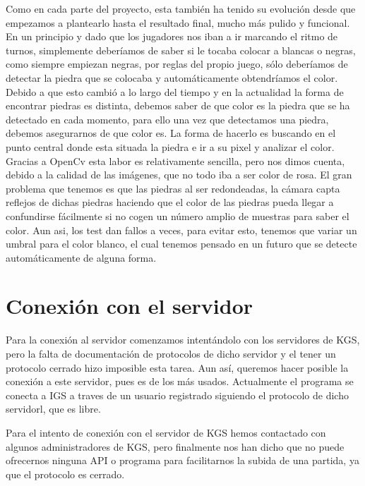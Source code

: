 \documentclass[12pt,a4papert,woside,openright,titlepage,final]{book}
\begin{document}
Como en cada parte del proyecto, esta también ha tenido su evolución desde que
empezamos a plantearlo hasta el resultado final, mucho más pulido y funcional.
En un principio y dado que los jugadores nos iban a ir marcando el ritmo de
turnos, simplemente deberíamos de saber si le tocaba colocar a blancas o negras, como
siempre empiezan negras, por reglas del propio juego, sólo deberíamos de detectar la
piedra que se colocaba y automáticamente obtendríamos el color. 
Debido a que esto cambió a lo largo del tiempo y en la actualidad la forma de
encontrar piedras es distinta, debemos saber de que color es la piedra que se ha
detectado en cada momento, para ello una vez que detectamos una piedra, debemos
asegurarnos de que color es. La forma de hacerlo es buscando en el punto central
donde esta situada la piedra e ir a su pixel y analizar el color. Gracias a
OpenCv esta labor es relativamente sencilla, pero nos dimos cuenta, debido a la
calidad de las imágenes, que no todo iba a ser color de rosa. El gran problema
que tenemos es que las piedras al ser redondeadas, la cámara capta reflejos de
dichas piedras haciendo que el color de las piedras pueda llegar a confundirse
fácilmente si no cogen un número amplio de muestras para saber el color. Aun
asi, los test dan fallos a veces, para evitar esto, tenemos que variar un umbral
para el color blanco, el cual tenemos pensado en un futuro que se detecte
automáticamente de alguna forma.





\section{Conexión con el servidor}

Para la conexión al servidor comenzamos intentándolo con los servidores de KGS,
pero la falta de documentación de protocolos de dicho servidor y el tener un
protocolo cerrado hizo imposible esta tarea. Aun así, queremos hacer posible la
conexión a este servidor, pues es de los más usados. Actualmente el programa se
conecta a IGS a traves de un usuario registrado siguiendo el protocolo de dicho
servidorl, que es libre.

Para el intento de conexión con el servidor de KGS hemos contactado con algunos
administradores de KGS, pero finalmente nos han dicho que no puede ofrecernos
ninguna API o programa para facilitarnos la subida de una partida, ya que el
protocolo es cerrado. 
\end{document}
